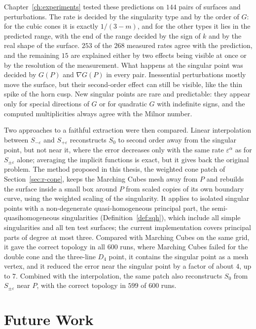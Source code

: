 \documentclass[12pt, a4paper, oneside]{book}
\theoremstyle{plain}
\theoremstyle{definition}
\theoremstyle{remark}
\theoremstyle{definition}
\begin{document}
Chapter~\ref{ch:experiments} tested these predictions on $144$ pairs of surfaces and perturbations. The rate is decided by the singularity type and by the order of $G$: for the cubic cones it is exactly $1/(3-m)$, and for the other types it lies in the predicted range, with the end of the range decided by the sign of $k$ and by the real shape of the surface. $253$ of the $268$ measured rates agree with the prediction, and the remaining $15$ are explained either by two effects being visible at once or by the resolution of the measurement. What happens at the singular point was decided by $G(P)$ and $\nabla G(P)$ in every pair. Inessential perturbations mostly move the surface, but their second-order effect can still be visible, like the thin spike of the horn cusp. New singular points are rare and predictable: they appear only for special directions of $G$ or for quadratic $G$ with indefinite signs, and the computed multiplicities always agree with the Milnor number.

Two approaches to a faithful extraction were then compared. Linear interpolation between $S_{-\varepsilon}$ and $S_{+\varepsilon}$ reconstructs $S_0$ to second order away from the singular point, but not near it, where the error decreases only with the same rate $\varepsilon^\alpha$ as for $S_{\pm\varepsilon}$ alone; averaging the implicit functions is exact, but it gives back the original problem. The method proposed in this thesis, the weighted cone patch of Section~\ref{sec:r-cone}, keeps the Marching Cubes mesh away from $P$ and rebuilds the surface inside a small box around $P$ from scaled copies of its own boundary curve, using the weighted scaling of the singularity. It applies to isolated singular points with a non-degenerate quasi-homogeneous principal part, the semi-quasihomogeneous singularities (Definition~\ref{def:sqh}), which include all simple singularities and all ten test surfaces; the current implementation covers principal parts of degree at most three. Compared with Marching Cubes on the same grid, it gave the correct topology in all $600$ runs, where Marching Cubes failed for the double cone and the three-line $D_4$ point, it contains the singular point as a mesh vertex, and it reduced the error near the singular point by a factor of about $4$, up to $7$. Combined with the interpolation, the same patch also reconstructs $S_0$ from $S_{\pm\varepsilon}$ near $P$, with the correct topology in $599$ of $600$ runs.

\section*{Future Work}
\end{document}
